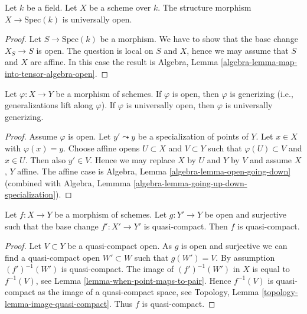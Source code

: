\begin{lemma}
\label{lemma-scheme-over-field-universally-open}
Let $k$ be a field. Let $X$ be a scheme over $k$.
The structure morphism $X \to \text{Spec}(k)$ is universally open.
\end{lemma}

\begin{proof}
Let $S \to \text{Spec}(k)$ be a morphism.
We have to show that the base change $X_S \to S$ is open.
The question is local on $S$ and $X$, hence we may assume that
$S$ and $X$ are affine. In this case the result is
Algebra, Lemma \ref{algebra-lemma-map-into-tensor-algebra-open}.
\end{proof}

\begin{lemma}
\label{lemma-open-generizing}
Let $\varphi : X \to Y$ be a morphism of schemes.
If $\varphi$ is open, then $\varphi$ is generizing
(i.e., generalizations lift along $\varphi$).
If $\varphi$ is universally open, then $\varphi$ is
universally generizing.
\end{lemma}

\begin{proof}
Assume $\varphi$ is open.
Let $y' \leadsto y$ be a specialization of points of $Y$.
Let $x \in X$ with $\varphi(x) = y$.
Choose affine opens $U \subset X$ and $V \subset Y$ such that
$\varphi(U) \subset V$ and $x \in U$. Then also $y' \in V$. Hence we
may replace $X$ by $U$ and $Y$ by $V$ and assume $X$, $Y$ affine.
The affine case is
Algebra, Lemma \ref{algebra-lemma-open-going-down}
(combined with
Algebra, Lemmma \ref{algebra-lemma-going-up-down-specialization}).
\end{proof}

\begin{lemma}
\label{lemma-descent-quasi-compact}
Let $f : X \to Y$ be a morphism of schemes.
Let $g : Y' \to Y$ be open and surjective such that the base change
$f' : X' \to Y'$ is quasi-compact. Then $f$ is quasi-compact.
\end{lemma}

\begin{proof}
Let $V \subset Y$ be a quasi-compact open. As $g$ is open and surjective
we can find a quasi-compact open $W' \subset W$ such that $g(W') = V$.
By assumption $(f')^{-1}(W')$ is quasi-compact. The image of
$(f')^{-1}(W')$ in $X$ is equal to $f^{-1}(V)$, see
Lemma \ref{lemma-when-point-maps-to-pair}.
Hence $f^{-1}(V)$ is quasi-compact as the image of a quasi-compact space, see
Topology, Lemma \ref{topology-lemma-image-quasi-compact}.
Thus $f$ is quasi-compact.
\end{proof}





